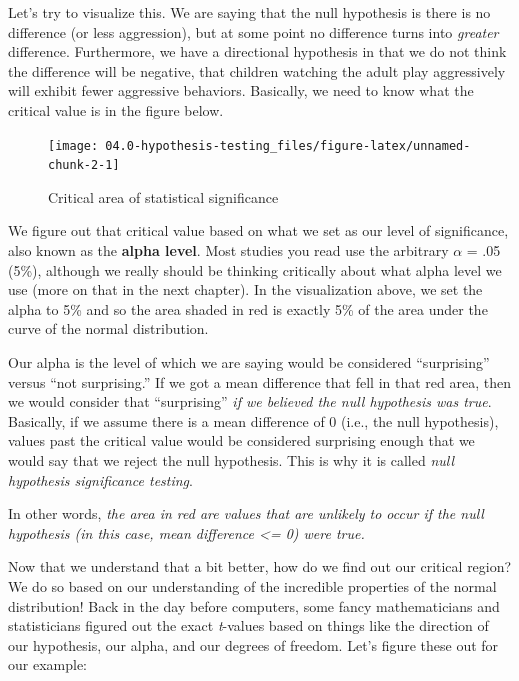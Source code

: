 \documentclass[
]{book}
\begin{document}
Let's try to visualize this. We are saying that the null hypothesis is there is no difference (or less aggression), but at some point no difference turns into \emph{greater} difference. Furthermore, we have a directional hypothesis in that we do not think the difference will be negative, that children watching the adult play aggressively will exhibit fewer aggressive behaviors. Basically, we need to know what the critical value is in the figure below.

\begin{figure}

{\centering \texttt{[image: 04.0-hypothesis-testing\_files/figure-latex/unnamed-chunk-2-1]} 

}

\caption{Critical area of statistical significance}\label{fig:unnamed-chunk-2}
\end{figure}

We figure out that critical value based on what we set as our level of significance, also known as the \textbf{alpha level}. Most studies you read use the arbitrary \(\alpha\) = .05 (5\%), although we really should be thinking critically about what alpha level we use (more on that in the next chapter). In the visualization above, we set the alpha to 5\% and so the area shaded in red is exactly 5\% of the area under the curve of the normal distribution.

Our alpha is the level of which we are saying would be considered ``surprising'' versus ``not surprising.'' If we got a mean difference that fell in that red area, then we would consider that ``surprising'' \emph{if we believed the null hypothesis was true}. Basically, if we assume there is a mean difference of 0 (i.e., the null hypothesis), values past the critical value would be considered surprising enough that we would say that we reject the null hypothesis. This is why it is called \emph{null hypothesis significance testing}.

In other words, \emph{the area in red are values that are unlikely to occur if the null hypothesis (in this case, mean difference \textless= 0) were true.}

Now that we understand that a bit better, how do we find out our critical region? We do so based on our understanding of the incredible properties of the normal distribution! Back in the day before computers, some fancy mathematicians and statisticians figured out the exact \emph{t}-values based on things like the direction of our hypothesis, our alpha, and our degrees of freedom. Let's figure these out for our example:
\end{document}
